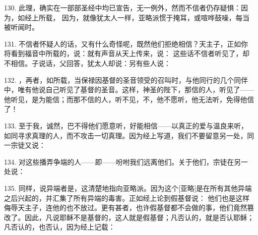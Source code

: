130. 此理，确实在一部部圣经中均已宣告，无一例外，然而不信者仍存疑惧：因为，如经上所载， 因为，就像犹太人一样，亚略派惯于掩耳，或喧哗鼓噪，每当被听闻时。\par

131. 不信者怀疑人的话，又有什么奇怪呢，既然他们拒绝相信？天主子，正如你将看到福音中所载的，说：就有声音从天上传来，说： 这些话不信者听见了，却不相信。子说话，父回答，犹太人却说：另有些人说：\par

132. ，再者，如所载，当保禄因基督的圣音领受的召叫时，与他同行的几个同伴中，唯有他说自己听见了基督的圣音。这样，神圣的陛下，那信的人，听见了——他听见，是为能信；而那不信的人，听不见，不，他不愿听，他无法听，免得他信了！\par

133. 至于我，诚然，巴不得他们愿意听，好能相信——以真正的爱与温良来听，如同寻求真理的人，而不攻击一切真理。因为经上写道，我们不要留意另一处，同一宗徒又说：\par

134. 对这些播弄争端的人——即——吩咐我们远离他们。关于他们，宗徒在另一处说：\par

135. 同样，说异端者是，这清楚地指向亚略派。因为这个[亚略]是在所有其他异端之后兴起的，并汇集了所有异端的毒害。正如经上论到假基督说： 他们也是这样侮辱天主子，连他的也不放过。更有甚者，也许假基督都不会做的事，他们竟然篡改了。因此，凡说耶稣不是基督的，这人就是假基督；凡否认的，就是否认耶稣；凡否认的，也否认，因为经上记载：\par

